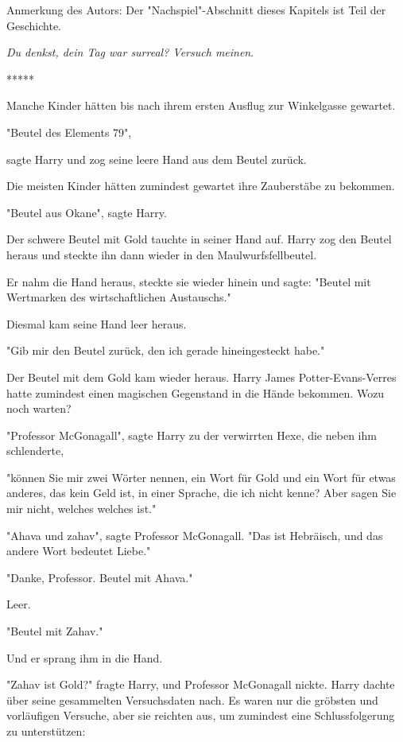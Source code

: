 

\hypertarget{der-planungsirrtum}{%

Anmerkung des Autors: Der "Nachspiel"-Abschnitt dieses Kapitels ist Teil der Geschichte.

\emph{Du denkst, dein Tag war surreal? Versuch meinen}.

*****

Manche Kinder hätten bis nach ihrem ersten Ausflug zur Winkelgasse gewartet.

"Beutel des Elements 79",

sagte Harry und zog seine leere Hand aus dem Beutel zurück.

Die meisten Kinder hätten zumindest gewartet ihre Zauberstäbe zu bekommen.

"Beutel aus Okane", sagte Harry.

Der schwere Beutel mit Gold tauchte in seiner Hand auf. Harry zog den Beutel heraus und steckte ihn dann wieder in den Maulwurfsfellbeutel.

Er nahm die Hand heraus, steckte sie wieder hinein und sagte: "Beutel mit Wertmarken des wirtschaftlichen Austauschs."

Diesmal kam seine Hand leer heraus.

"Gib mir den Beutel zurück, den ich gerade hineingesteckt habe."

Der Beutel mit dem Gold kam wieder heraus. Harry James Potter-Evans-Verres hatte zumindest einen magischen Gegenstand in die Hände bekommen. Wozu noch warten?

"Professor McGonagall", sagte Harry zu der verwirrten Hexe, die neben ihm schlenderte,

"können Sie mir zwei Wörter nennen, ein Wort für Gold und ein Wort für etwas anderes, das kein Geld ist, in einer Sprache, die ich nicht kenne? Aber sagen Sie mir nicht, welches welches ist."

"Ahava und zahav", sagte Professor McGonagall. "Das ist Hebräisch, und das andere Wort bedeutet Liebe."

"Danke, Professor. Beutel mit Ahava."

Leer.

"Beutel mit Zahav."

Und er sprang ihm in die Hand.

"Zahav ist Gold?" fragte Harry, und Professor McGonagall nickte. Harry dachte über seine gesammelten Versuchsdaten nach. Es waren nur die gröbsten und vorläufigen Versuche, aber sie reichten aus, um zumindest eine Schlussfolgerung zu unterstützen:

}
